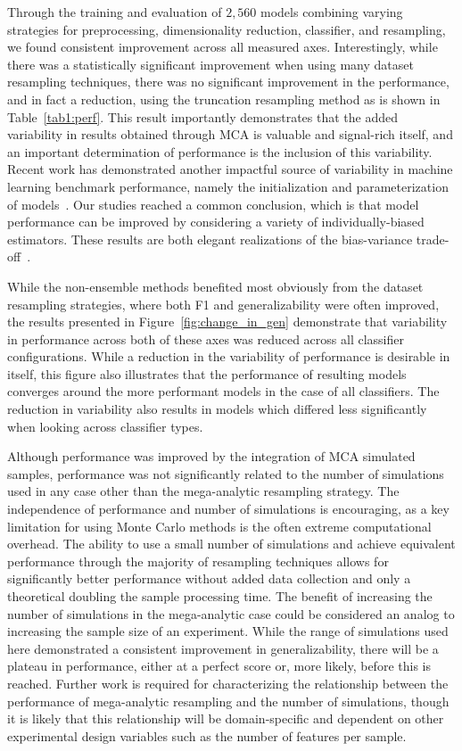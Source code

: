 \documentclass[10pt]{SelfArx} %
\newcommand{\new}[1]{\color{blue}#1\color{black}}
\begin{document}
Through the training and evaluation of $2,560$ models combining varying strategies for preprocessing, dimensionality
reduction, classifier, and resampling, we found consistent improvement across all measured axes. Interestingly, while
there was a statistically significant improvement when using many dataset resampling techniques, there was no
significant improvement in the performance, and in fact a reduction, using the truncation resampling method as is shown
in Table~\ref{tab1:perf}. This result importantly demonstrates that the added variability in results obtained through
MCA is valuable and signal-rich itself, and an important determination of performance is the inclusion of this
variability. \new{Recent work has demonstrated another impactful source of variability in machine learning benchmark
performance, namely the initialization and parameterization of models~\cite{bouthillier2021accounting}. Our studies
reached a common conclusion, which is that model performance can be improved by considering a variety of
individually-biased estimators. These results are both elegant realizations of the bias-variance
trade-off~\cite{geman1992neural}}.

While the non-ensemble methods benefited most obviously from the dataset resampling strategies, where both F1 and
generalizability were often improved, the results presented in Figure~\ref{fig:change_in_gen} demonstrate that
variability in performance across both of these axes was reduced across all classifier configurations. While a
reduction in the variability of performance is desirable in itself, this figure also illustrates that the performance
of resulting models converges around the more performant models in the case of all classifiers. The reduction in
variability also results in models which differed less significantly when looking across classifier types.

Although performance was improved by the integration of MCA simulated samples, performance was not significantly
related to the number of simulations used in any case other than the mega-analytic resampling strategy. The
independence of performance and number of simulations is encouraging, as a key limitation for using Monte Carlo methods
is the often extreme computational overhead. The ability to use a small number of simulations and achieve equivalent
performance through the majority of resampling techniques allows for significantly better performance without added
data collection and only a theoretical doubling the sample processing time. The benefit of increasing the number of
simulations in the mega-analytic case could be considered an analog to increasing the sample size of an experiment.
While the range of simulations used here demonstrated a consistent improvement in generalizability, there will be a
plateau in performance, either at a perfect score or, more likely, before this is reached. Further work is required for
characterizing the relationship between the performance of mega-analytic resampling and the number of simulations,
though it is likely that this relationship will be domain-specific and dependent on other experimental design variables
such as the number of features per sample.
\end{document}
